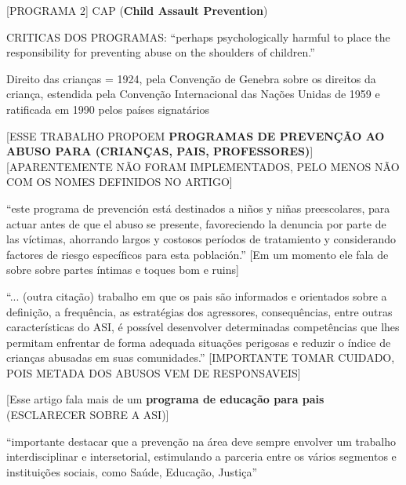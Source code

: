 [PROGRAMA 2] CAP (\textbf{Child Assault Prevention}) \cite{finkelhor2009prevention}

CRITICAS DOS PROGRAMAS: ``perhaps psychologically harmful to place the responsibility for preventing abuse on the shoulders of children.'' \cite{finkelhor2009prevention}


Direito das crianças = 1924, pela Convenção de Genebra sobre os direitos da criança, estendida pela Convenção Internacional das Nações Unidas de 1959 e ratificada em 1990 pelos países signatários \cite{aded2006abuso} 


[ESSE TRABALHO PROPOEM \textbf{PROGRAMAS DE PREVENÇÃO AO ABUSO PARA (CRIANÇAS, PAIS, PROFESSORES)}] \cite{mariscal2003programa} [APARENTEMENTE NÃO FORAM IMPLEMENTADOS, PELO MENOS NÃO COM OS NOMES DEFINIDOS NO ARTIGO]

``este programa de prevención está destinados a niños y niñas preescolares, para actuar antes de que el abuso se presente, favoreciendo la denuncia por parte de las víctimas, ahorrando largos y costosos períodos de tratamiento y considerando factores de riesgo específicos para esta población.'' [Em um momento ele fala de sobre sobre partes íntimas e toques bom e ruins] \cite{mariscal2003programa}

``... (outra citação) trabalho  em  que  os  pais  são informados  e  orientados  sobre  a  definição,  a  frequência,  as  estratégias  dos  agressores, consequências, entre outras características do ASI, é possível desenvolver determinadas competências  que  lhes  permitam  enfrentar  de  forma  adequada  situações  perigosas  e reduzir  o  índice  de  crianças  abusadas  em  suas  comunidades.'' [IMPORTANTE TOMAR CUIDADO, POIS METADA DOS ABUSOS VEM DE RESPONSAVEIS] \cite{pinto2017avaliaccao}

[Esse artigo fala mais de um \textbf{programa de educação para pais} (ESCLARECER SOBRE A ASI)]

``importante  destacar  que  a  prevenção  na  área  deve  sempre  envolver  um trabalho interdisciplinar e intersetorial, estimulando a parceria entre os vários segmentos e instituições   sociais,   como   Saúde,   Educação,   Justiça'' \cite{pinto2017avaliaccao}

